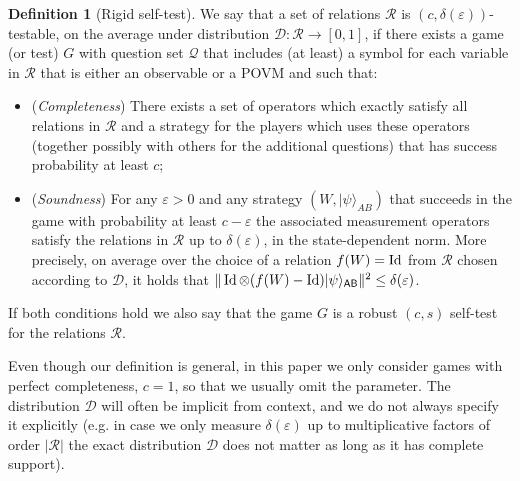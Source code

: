 \documentclass[11pt]{article}
\theoremstyle{remark}
\theoremstyle{definition}
\newtheorem{definition}[theorem]{Definition}
\newcommand{\ket}[1]{|#1\rangle}
\newcommand{\Id}{\ensuremath{\mathop{\rm Id}\nolimits}}
\newcommand{\reg}[1]{{\textsf{#1}}}
\newcommand{\eps}{\varepsilon}
\begin{document}
\begin{definition}[Rigid self-test]
We say that a set of relations $\mathcal{R}$ is $(c,\delta(\eps))$-testable, on the average under distribution $\mathcal{D}:\mathcal{R}\to[0,1]$, if
  there exists a game (or test) $G$ with question set $\mathcal{Q}$ that
  includes (at least) a symbol for each variable in $\mathcal{R}$ that is either an observable or a POVM and such that:
\begin{itemize}
\item (\emph{Completeness}) There exists a set of operators which exactly satisfy all relations in $\mathcal{R}$ and a strategy for the players which uses these operators (together possibly with others for the additional questions) that has success probability at least $c$;
\item (\emph{Soundness}) For any $\eps>0$ and any strategy $(W,\ket{\psi}_{AB})$ that succeeds in the game with probability at least $c-\eps$ the associated measurement operators satisfy the relations in $\mathcal{R}$ up to $\delta(\eps)$, in the state-dependent norm. More precisely, on average
 over the choice of a relation $f(W)=\Id$ from $\mathcal{R}$ chosen according to $\mathcal{D}$, it holds that $\| \Id\otimes (f(W)-\Id) \ket{\psi}_{\reg{AB}}\|^2 \leq \delta(\eps)$.
\end{itemize}
If both conditions hold we also say that the game $G$ is a robust $(c,s)$ self-test for the relations $\mathcal{R}$. 
\end{definition}

Even though our definition is general, in this paper we only consider games with perfect completeness, $c=1$, so that we usually omit the parameter. The distribution $\mathcal{D}$ will often be implicit from context, and we do not always specify it explicitly (e.g. in case we only measure $\delta(\eps)$ up to multiplicative factors of order $|\mathcal{R}|$ the exact distribution $\mathcal{D}$ does not matter as long as it has complete support). 
\end{document}
